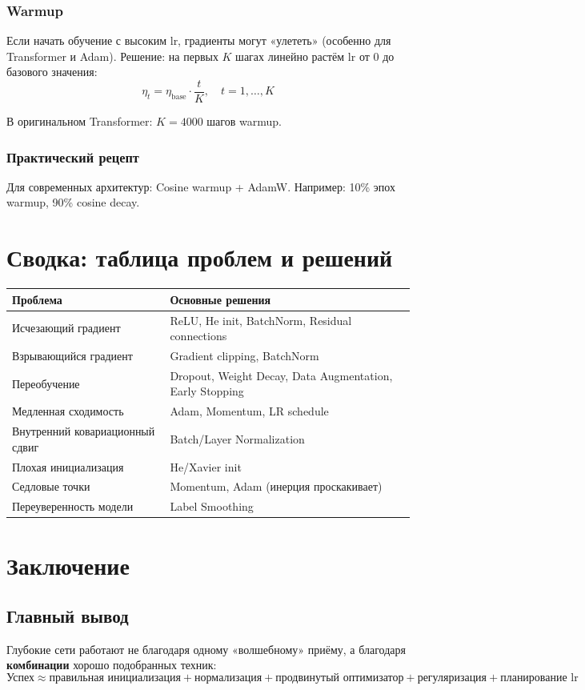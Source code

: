 \documentclass[a4paper,12pt]{article}
\begin{document}
\subsubsection{Warmup}
Если начать обучение с высоким lr, градиенты могут «улететь» (особенно для Transformer и Adam). Решение: на первых $K$ шагах линейно растём lr от 0 до базового значения:
\[
\eta_t = \eta_{\text{base}} \cdot \frac{t}{K}, \quad t = 1, \dots, K
\]

В оригинальном Transformer: $K = 4000$ шагов warmup.

\subsubsection{Практический рецепт}
Для современных архитектур: Cosine warmup + AdamW. Например: 10\% эпох warmup, 90\% cosine decay.

\section{Сводка: таблица проблем и решений}

\begin{center}
\begin{tabular}{ll}
\toprule
\textbf{Проблема} & \textbf{Основные решения} \\
\midrule
Исчезающий градиент & ReLU, He init, BatchNorm, Residual connections \\
Взрывающийся градиент & Gradient clipping, BatchNorm \\
Переобучение & Dropout, Weight Decay, Data Augmentation, Early Stopping \\
Медленная сходимость & Adam, Momentum, LR schedule \\
Внутренний ковариационный сдвиг & Batch/Layer Normalization \\
Плохая инициализация & He/Xavier init \\
Седловые точки & Momentum, Adam (инерция проскакивает) \\
Переуверенность модели & Label Smoothing \\
\bottomrule
\end{tabular}
\end{center}

\section{Заключение}

\subsection{Главный вывод}
Глубокие сети работают не благодаря одному «волшебному» приёму, а благодаря \textbf{комбинации} хорошо подобранных техник:
\[
\text{Успех} \approx \text{правильная инициализация} + \text{нормализация} + \text{продвинутый оптимизатор} + \text{регуляризация} + \text{планирование lr}
\]
\end{document}
